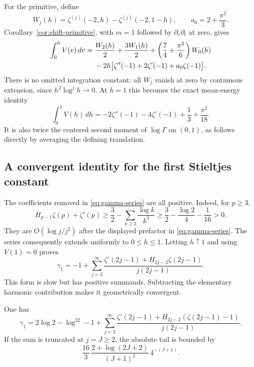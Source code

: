 For the primitive, define
\[
 W_j(h)=\zeta^{(j)}(-2,h)-\zeta^{(j)}(-2,1-h),\qquad
 a_0=2+\frac{\pi^2}{3}.
\]
Corollary~\ref{cor:shift-primitive}, with $m=1$ followed by
$\partial_s\partial_t$ at zero, gives
\begin{align}
 \int_0^h V(v)\,dv={}&\frac{W_2(h)}2+\frac{3W_1(h)}2
            +\left(\frac74+\frac{\pi^2}{6}\right)W_0(h)\notag\\
 &-2h\bigl[\zeta''(-1)+2\zeta'(-1)+a_0\zeta(-1)\bigr].
 \label{eq:V-primitive}
\end{align}
There is no omitted integration constant: all $W_j$ vanish at zero
by continuous extension, since $h^2\log^j h\to0$. At $h=1$ this
becomes the exact mean-energy identity
\begin{equation}\label{eq:V-mean}
 \int_0^1 V(h)\,dh
 =-2\zeta''(-1)-4\zeta'(-1)+\frac13+\frac{\pi^2}{18}.
\end{equation}
It is also twice the centered second moment of $\log\Gamma$ on
$(0,1)$, as follows directly by averaging the defining translation.

\subsection{A convergent identity for the first Stieltjes constant}

The coefficients removed in \eqref{eq:gamma-series} are all positive.
Indeed, for $p\geq3$,
\[
 H_{p-1}\zeta(p)+\zeta'(p)
 \geq\frac32-\sum_{k\geq2}\frac{\log k}{k^3}
 \geq\frac32-\frac{\log2}{4}-\frac1{16}>0.
\]
They are $O(\log j/j^2)$ after the displayed prefactor in
\eqref{eq:gamma-series}. The series consequently extends uniformly to
$0\leq h\leq1$. Letting $h\uparrow1$ and using $V(1)=0$ proves
\begin{equation}\label{eq:gamma1-odd}
 \boxed{\quad
 \gamma_1=-1+\sum_{j=2}^{\infty}
   \frac{\zeta'(2j-1)+H_{2j-2}\zeta(2j-1)}{j(2j-1)}.
 \quad}
\end{equation}
This form is slow but has positive summands. Subtracting the elementary
harmonic contribution makes it geometrically convergent.

\begin{corollary}\label{cor:gamma1-fast}
One has
\begin{equation}\label{eq:gamma1-fast}
 \boxed{\quad
 \gamma_1=2\log2-\log^22-1+
 \sum_{j=2}^{\infty}
 \frac{\zeta'(2j-1)+H_{2j-2}(\zeta(2j-1)-1)}{j(2j-1)}.
 \quad}
\end{equation}
If the sum is truncated at $j=J\geq2$, the absolute tail is bounded by
\begin{equation}\label{eq:gamma1-tail}
 \frac{16}{3}\,
 \frac{2+\log(2J+2)}{(J+1)^2}\,4^{-(J+1)}.
\end{equation}
\end{corollary}

